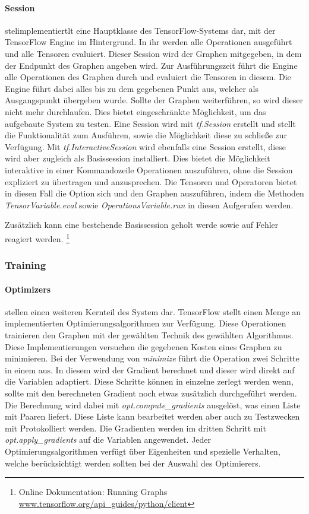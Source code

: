 \paragraph{Session} stelimplementiertlt eine Hauptklasse des TensorFlow-Systems dar, mit der TensorFlow Engine im Hintergrund.
In ihr werden alle Operationen ausgeführt und alle Tensoren evaluiert. 
Dieser Session wird der Graphen mitgegeben, in dem der Endpunkt des Graphen angeben wird. 
Zur Ausführungszeit führt die Engine alle Operationen des Graphen durch und evaluiert die Tensoren in diesem. 
Die Engine führt dabei alles bis zu dem gegebenen Punkt aus, welcher als Ausgangspunkt übergeben wurde. 
Sollte der Graphen weiterführen, so wird dieser nicht mehr durchlaufen. 
Dies bietet eingeschränkte Möglichkeit, um das aufgebaute System zu testen. 
Eine Session wird mit \textit{tf.Session} erstellt und stellt die Funktionalität zum Ausführen, sowie die Möglichkeit diese zu schließe zur Verfügung. 
Mit \textit{tf.InteractiveSession} wird ebenfalls eine Session erstellt, diese wird aber zugleich als Basissession installiert. 
Dies bietet die Möglichkeit interaktive in einer Kommandozeile Operationen auszuführen, ohne die Session expliziert zu übertragen und anzusprechen. 
Die Tensoren und Operatoren bietet in diesen Fall die Option sich und den Graphen auszuführen, indem die Methoden \textit{TensorVariable.eval} sowie \textit{OperationsVariable.run} in diesen Aufgerufen werden. 

\noindent
Zusätzlich kann eine bestehende Basissession geholt werde sowie auf Fehler reagiert werden. 
\footnote{Online Dokumentation: Running Graphs \url{www.tensorflow.org/api_guides/python/client}}

\subsubsection{Training}

\paragraph{Optimizers} stellen einen weiteren Kernteil des System dar. 
TensorFlow stellt einen Menge an implementierten Optimierungsalgorithmen zur Verfügung. 
Diese Operationen trainieren den Graphen mit der gewählten Technik des gewählten Algorithmus. 
Diese Implementierungen versuchen die gegebenen Kosten eines Graphen zu minimieren. 
Bei der Verwendung von \textit{minimize} führt die Operation zwei Schritte in einem aus. 
In diesem wird der Gradient berechnet und dieser wird direkt auf die Variablen adaptiert. 
Diese Schritte können in einzelne zerlegt werden wenn, sollte mit den berechneten Gradient noch etwas zusätzlich durchgeführt werden. 
Die Berechnung wird dabei mit \textit{opt.compute\_gradients} ausgelöst, was einen Liste mit Paaren liefert. 
Diese Liste kann bearbeitet werden aber auch zu Testzwecken mit Protokolliert werden. 
Die Gradienten werden im dritten Schritt mit \textit{opt.apply\_gradients} auf die Variablen angewendet. 
Jeder Optimierungsalgorithmen verfügt über Eigenheiten und spezielle Verhalten, welche berücksichtigt werden sollten bei der Auswahl des Optimierers.

